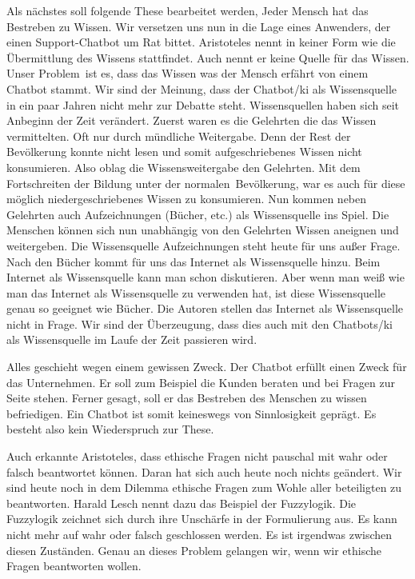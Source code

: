 Als nächstes soll folgende These bearbeitet werden, \glqq Jeder Mensch hat das Bestreben zu Wissen\grqq. Wir versetzen uns nun in die Lage eines Anwenders, der einen Support-Chatbot um Rat bittet. Aristoteles nennt in keiner Form wie die Übermittlung des Wissens stattfindet. Auch nennt er keine Quelle für das Wissen. Unser \glqq Problem\grqq\ ist es, dass das Wissen was der Mensch erfährt von einem Chatbot stammt. Wir sind der Meinung, dass der Chatbot/\ac{ki} als Wissensquelle in ein paar Jahren nicht mehr zur Debatte steht. Wissensquellen haben sich seit Anbeginn der Zeit verändert. Zuerst waren es die Gelehrten die das Wissen vermittelten. Oft nur durch mündliche Weitergabe. Denn der Rest der Bevölkerung konnte nicht lesen und somit aufgeschriebenes Wissen nicht konsumieren. Also oblag die Wissensweitergabe den Gelehrten. Mit dem Fortschreiten der Bildung unter der \glqq normalen\grqq\ Bevölkerung, war es auch für diese möglich niedergeschriebenes Wissen zu konsumieren. Nun kommen neben Gelehrten auch Aufzeichnungen (Bücher, etc.) als Wissensquelle ins Spiel. Die Menschen können sich nun unabhängig von den Gelehrten Wissen aneignen und weitergeben. Die Wissensquelle Aufzeichnungen steht heute für uns außer Frage. Nach den Bücher kommt für uns das Internet als Wissensquelle hinzu. Beim Internet als Wissensquelle kann man schon diskutieren. Aber wenn man weiß wie man das Internet als Wissensquelle zu verwenden hat, ist diese Wissensquelle genau so geeignet wie Bücher. Die Autoren stellen das Internet als Wissensquelle nicht in Frage. Wir sind der Überzeugung, dass dies auch mit den Chatbots/\ac{ki} als Wissensquelle im Laufe der Zeit passieren wird. 

\glqq Alles geschieht wegen einem gewissen Zweck\grqq. Der Chatbot erfüllt einen Zweck für das Unternehmen. Er soll zum Beispiel die Kunden beraten und bei Fragen zur Seite stehen. Ferner gesagt, soll er das Bestreben des Menschen zu wissen befriedigen. Ein Chatbot ist somit keineswegs von Sinnlosigkeit geprägt. Es besteht also kein Wiederspruch zur These.

Auch erkannte Aristoteles, dass ethische Fragen nicht pauschal mit wahr oder falsch beantwortet können. Daran hat sich auch heute noch nichts geändert. Wir sind heute noch in dem Dilemma ethische Fragen zum Wohle aller beteiligten zu beantworten. Harald Lesch nennt dazu das Beispiel der Fuzzylogik. Die Fuzzylogik zeichnet sich durch ihre Unschärfe in der Formulierung aus. Es kann nicht mehr auf wahr oder falsch geschlossen werden. Es ist irgendwas zwischen diesen Zuständen. Genau an dieses Problem gelangen wir, wenn wir ethische Fragen beantworten wollen.

